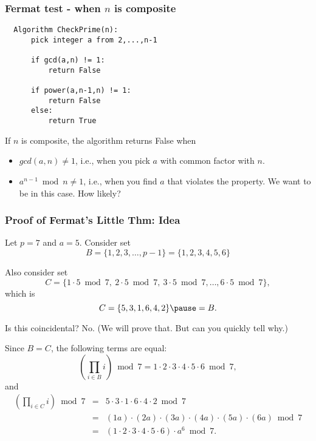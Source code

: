 \begin{frame}[fragile]
  \frametitle{Fermat test - when $n$ is composite}

  \begin{tcolorbox}
  {\tiny
\begin{verbatim}
  Algorithm CheckPrime(n):
      pick integer a from 2,...,n-1

      if gcd(a,n) != 1:
          return False

      if power(a,n-1,n) != 1:
          return False
      else:
          return True
\end{verbatim}
  }
  \end{tcolorbox}

  If $n$ is composite, the algorithm returns False when
  \pause
  
  \begin{itemize}
  \item $gcd(a,n)\neq 1$, i.e., when you pick $a$ with common factor with $n$.
    \pause
  \item $a^{n-1}\bmod n\neq 1$, i.e., when you find $a$ that violates
    the property.  We want to be in this case.  How likely?
  \end{itemize}
  
\end{frame}



\begin{frame}
  \frametitle{Proof of Fermat's Little Thm: Idea}

  {\footnotesize
    Let $p=7$ and $a=5$. Consider set
    \[
    B = \{1,2,3,\ldots,p-1\}
    = \{1,2,3,4,5,6\}
    \]
    
    Also consider set
    \[
    C = \{
    1\cdot 5\bmod 7,\
    2\cdot 5\bmod 7,\
    3\cdot 5\bmod 7,\ldots,
    6\cdot 5\bmod 7
    \},
    \]
    which is \pause
    \[
    C = \{
    5, 3, 1, 6, 4, 2
    \}
    \pause = B.
    \]

    \pause Is this coincidental?  \pause No. (We will prove that. But
    can you quickly tell why.)
    
    Since $B = C$, the following terms are equal:
    \[
    \left(\prod_{i\in B} i\right) \bmod 7 = 1\cdot 2\cdot 3\cdot 4\cdot 5\cdot 6 \bmod 7,
    \]
    and
    \[
    \begin{array}{rcl}
      \left(\prod_{i\in C} i\right) \bmod 7 &=& 5\cdot 3\cdot 1\cdot 6\cdot 4\cdot 2 \bmod 7\\
      &=& (1a)\cdot (2a)\cdot (3a)\cdot (4a)\cdot (5a)\cdot (6a) \bmod 7 \\
      &=& (1\cdot 2\cdot 3\cdot 4\cdot 5\cdot 6)\cdot a^{6} \bmod 7.
    \end{array}
    \]
  }
  
\end{frame}

